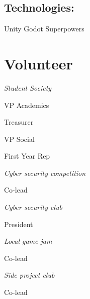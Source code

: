\documentclass[]{deedy-resume-openfont}
\begin{document}
\begin{minipage}[t]{0.33\textwidth}
\sectionsep
\subsection{Technologies:}
\sectionsep

Unity \textbullet{} Godot \textbullet{} Superpowers\\

\sectionsep

\section{Volunteer}

\textit{Student Society}
\begin{tightemize}

\item VP Academics

\item Treasurer

\item VP Social

\item First Year Rep

\end{tightemize}
\textit{Cyber security competition}
\begin{tightemize}

\item Co-lead

\end{tightemize}
\textit{Cyber security club}
\begin{tightemize}

\item President

\end{tightemize}
\textit{Local game jam}
\begin{tightemize}

\item Co-lead

\end{tightemize}
\textit{Side project club}
\begin{tightemize}

\item Co-lead

\end{tightemize}

%
%

\end{minipage} 
\end{document}
